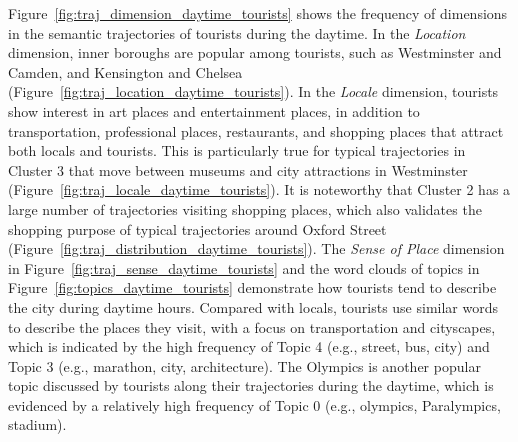 \documentclass{article}
\theoremstyle{remark}
\begin{document}
Figure~\ref{fig:traj_dimension_daytime_tourists} shows the frequency of dimensions in the semantic trajectories of tourists during the daytime. In the \textit{Location} dimension, inner boroughs are popular among tourists, such as Westminster and Camden, and Kensington and Chelsea (Figure~\ref{fig:traj_location_daytime_tourists}). In the \textit{Locale} dimension, tourists show interest in art places and entertainment places, in addition to transportation, professional places, restaurants, and shopping places that attract both locals and tourists. This is particularly true for typical trajectories in Cluster 3 that move between museums and city attractions in Westminster (Figure~\ref{fig:traj_locale_daytime_tourists}). It is noteworthy that Cluster 2 has a large number of trajectories visiting shopping places, which also validates the shopping purpose of typical trajectories around Oxford Street (Figure~\ref{fig:traj_distribution_daytime_tourists}). The \textit{Sense of Place} dimension in Figure~\ref{fig:traj_sense_daytime_tourists} and the word clouds of topics in Figure~\ref{fig:topics_daytime_tourists} demonstrate how tourists tend to describe the city during daytime hours. Compared with locals, tourists use similar words to describe the places they visit, with a focus on transportation and cityscapes, which is indicated by the high frequency of Topic 4 (e.g., street, bus, city) and Topic 3 (e.g., marathon, city, architecture). The Olympics is another popular topic discussed by tourists along their trajectories during the daytime, which is evidenced by a relatively high frequency of Topic 0 (e.g., olympics, Paralympics, stadium).
\end{document}
